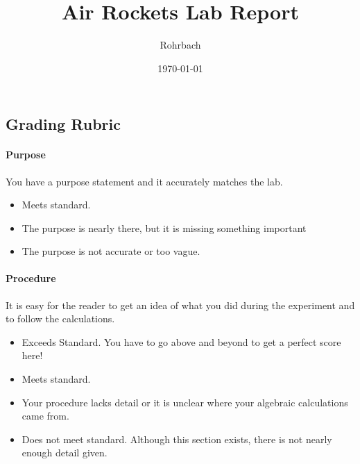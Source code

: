 \documentclass[10pt]{exam}
\title{Air Rockets Lab Report}
\author{Rohrbach}
\date{\today}
\begin{document}
\maketitle


\begin{Sbox}\begin{minipage}{6.3in}
  \section*{Grading Rubric}


  \paragraph{Purpose} You have a purpose statement and it accurately matches the lab.	
  \begin{itemize}
    \item[\bf 5:] Meets standard.	
    \item[\bf 4:] The purpose is nearly there, but it is missing something important
    \item[\bf 3:] The purpose is not accurate or too vague.
  \end{itemize}

  \vspace{-0.25em}

  \paragraph{Procedure} It is easy for the reader to get an idea of what you did during the experiment and to follow the calculations.
  \begin{itemize}
    \item[\bf 10:] Exceeds Standard. You have to go above and beyond to get a perfect score here!
    \item[\bf 8:] Meets standard.
    \item[\bf 6:] Your procedure lacks detail or it is unclear where your algebraic calculations came from.
    \item[\bf 4:] Does not meet standard.  Although this section exists, there is not nearly enough detail given.
  \end{itemize}

  \vspace{-0.25em}


\end{minipage}
\end{Sbox}
\end{document}
